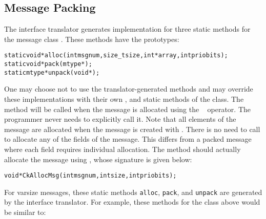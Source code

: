 
\subsection{Message Packing}

\label{message packing}

The \charmpp{} interface translator generates implementation for three static
methods for the message class . These methods have the
prototypes:

\begin{alltt}
    static void* alloc(int msgnum, size_t size, int* array, int priobits);
    static void* pack(mtype*);
    static mtype* unpack(void*);
\end{alltt}

One may choose not to use the translator-generated methods and may override
these implementations with their own ,  and 
static methods of the  class.  The  method will be called
when the message is allocated using the \CC\  operator. The programmer
never needs to explicitly call it.  Note that all elements of the message are
allocated when the message is created with . There is no need to call
 to allocate any of the fields of the message. This differs from a
packed message where each field requires individual allocation. The 
method should actually allocate the message using , whose
signature is given below:

\begin{alltt}
void *CkAllocMsg(int msgnum, int size, int priobits); 
\end{alltt}  


For varsize messages, these static methods \texttt{alloc}, \texttt{pack}, and 
\texttt{unpack} are
generated by the interface translator.  For example, these
methods for the  class above would be similar to:


